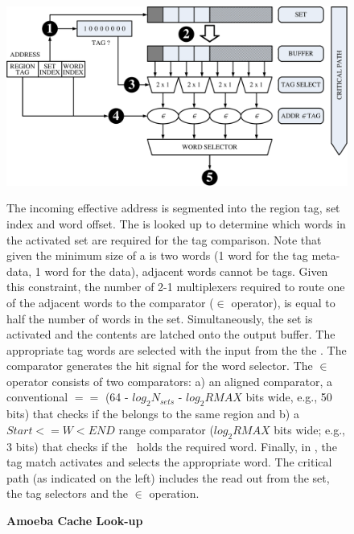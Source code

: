 \begin{figure}[h]
\begin{minipage}[c]{\textwidth}

 
  \includegraphics[width=\textwidth]{files/Figures/06-Lookup.pdf}
  \caption[Amoeba Cache Look-up]{\textbf{Amoeba Cache Look-up} }
  \label{fig:ac_lookup}
\vspace{20pt}
The incoming effective address is segmented into the region tag, set index and word offset.  The  is looked up to determine which words in the activated set are required for the tag comparison. Note that given the minimum size of a \AB{} is two words (1 word for the tag meta-data, 1 word for the data), adjacent words cannot be tags. Given this constraint, the number of 2-1 multiplexers required to route one of the adjacent words to the comparator ($\in$ operator), is equal to half the number of words in the set.  Simultaneously, the set is activated and the contents are latched onto the output buffer.  The appropriate tag words are selected with the input from the the .  The comparator generates the hit signal for the word selector. The $\in$ operator consists of two comparators: a) an aligned  comparator, a conventional $==$ (64 - $log_2N_{sets}$ - $log_2{RMAX}$ bits wide, e.g., 50 bits) that checks if the \AB{} belongs to the same region and b) a $ Start <= W < END $ range comparator ($log_2RMAX$ bits wide; e.g., 3 bits) that checks if the \AB\ holds the required word. Finally, in , the tag match activates and selects the appropriate word. The critical path (as indicated on the left) includes the read out from the set, the tag selectors and the $\in$ operation.

\end{minipage}
\end{figure}

